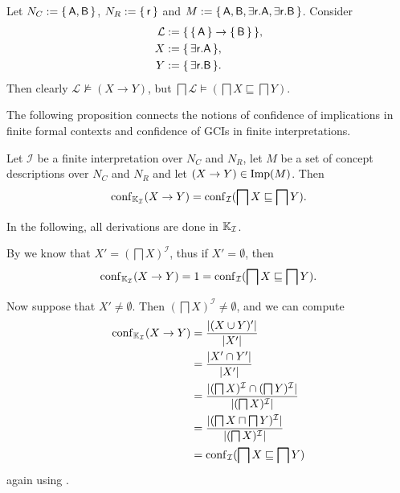 \begin{Example}
  \label{expl:gci-entailment-does-not-impliy-implicational-entailment}
  Let $N_C := {\{\, \mathsf{A}, \mathsf{B} \,\}}$, $N_R := {\{\, \mathsf{r} \,\}}$ and $M := {\{\,
    \mathsf{A}, \mathsf{B}, \mathsf{\exists r. A}, \mathsf{\exists r. B} \,\}}$.  Consider
  \begin{align*}
    \mathcal{L} &:= {\{\, {\{\, \mathsf{A} \,\}} \to {\ensuremath{\{\, \mathsf{B} \,\}}} \,\}}, \\
    X &:= {\{\, \mathsf{\exists r. A} \,\}}, \\
    Y &:= {\{\, \mathsf{\exists r. B} \,\}}.
  \end{align*}
  Then clearly $\mathcal{L} \not\models (X \to Y)$, but $\bigsqcap \mathcal{L} \models
  (\bigsqcap X \sqsubseteq \bigsqcap Y)$.
\end{Example}

The following proposition connects the notions of confidence of implications in finite
formal contexts and confidence of GCIs in finite interpretations.

\begin{Proposition}
  \label{prop:confidence-in-interpretation-is-the-same-as-in-induced-context}
  Let $\mathcal{I}$ be a finite interpretation over $N_C$ and $N_R$, let $M$ be a set of
  concept descriptions over $N_C$ and $N_R$ and let $(X \to Y) \in \operatorname{Imp}(M)$.  Then
  \begin{equation*}
    \operatorname{conf}_{{\mathbb{K}}_{\mathcal{I}}}( X \to Y ) = \operatorname{conf}_{\mathcal{I}}( \bigsqcap X \sqsubseteq
    \bigsqcap Y ).
  \end{equation*}
\end{Proposition}
\begin{Proof}
  In the following, all derivations are done in ${\mathbb{K}}_{\mathcal{I}}$.
  
  By  we know that $X' = (\bigsqcap X)^{\mathcal{I}}$,
  thus if $X' = \emptyset$, then
  \begin{equation*}
    \operatorname{conf}_{{\mathbb{K}}_{\mathcal{I}}}( X \to Y ) = 1 = \operatorname{conf}_{\mathcal{I}}( \bigsqcap X
    \sqsubseteq \bigsqcap Y ).
  \end{equation*}

  Now suppose that $X' \neq \emptyset$.  Then $(\bigsqcap X)^{\mathcal{I}} \neq
  \emptyset$, and we can compute
  \begin{align*}
    \operatorname{conf}_{{\mathbb{K}}_{\mathcal{I}}}( X \to Y )
    &= \frac{ \lvert (X \cup Y)' \rvert }{ \lvert X' \rvert } \\
    &= \frac{ \lvert X' \cap Y' \rvert }{ \lvert X' \rvert } \\
    &= \frac{ \lvert (\bigsqcap X)^{\mathcal{I}} \cap (\bigsqcap Y)^{\mathcal{I}} \rvert }{
      \lvert (\bigsqcap X)^{\mathcal{I}} \rvert } \\
    &= \frac{ \lvert (\bigsqcap X \sqcap \bigsqcap Y)^{\mathcal{I}} \rvert }{ \lvert (\bigsqcap
        X)^{\mathcal{I}} \rvert } \\
    &= \operatorname{conf}_{\mathcal{I}} (\bigsqcap X \sqsubseteq \bigsqcap Y)
  \end{align*}
  again using .
\end{Proof}

